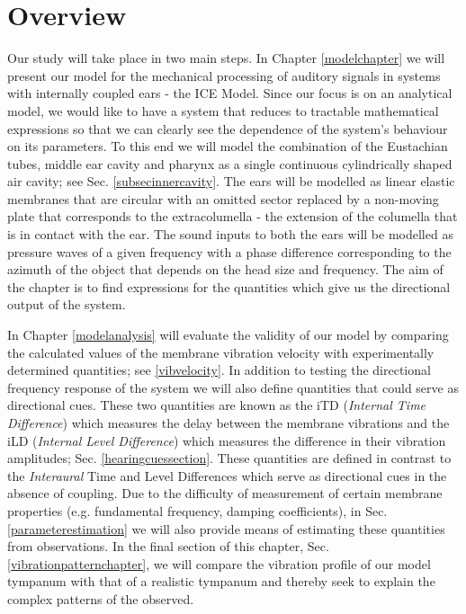 \documentclass[12pt]{book}
\begin{document}
\section{Overview}
Our study will take place in two main steps. In Chapter \ref{modelchapter} we will
present our model for the mechanical processing of auditory signals in systems with internally coupled ears - the ICE Model.
Since our focus is on an analytical model, we would like to have a system that reduces to tractable mathematical expressions
so that we can clearly see the dependence of the system's behaviour on its parameters. To this end we will model the 
combination of the Eustachian tubes, middle ear cavity and pharynx as a single continuous cylindrically shaped air cavity; see
Sec. \ref{subsecinnercavity}. The ears will be modelled as linear elastic membranes that are circular with an omitted sector replaced
by a non-moving plate
that corresponds to the extracolumella - the extension of the columella that is in contact with the ear. The
sound inputs to both the ears will be modelled as pressure waves of a given frequency with a phase difference corresponding to the azimuth of the object that depends on the 
head size and frequency. The aim of the chapter is to find expressions for the quantities which give us the directional output of the system.

In Chapter \ref{modelanalysis} will evaluate the validity of our model
by comparing the calculated values of the membrane vibration velocity with experimentally determined quantities; 
see \ref{vibvelocity}. In addition to testing the directional frequency
response of the system we will also define quantities that could serve as directional cues. These two quantities are known
as the iTD (\emph{Internal Time Difference}) which measures the delay between the membrane vibrations and the iLD (\emph{Internal Level
Difference}) which measures the difference in their vibration amplitudes; Sec. \ref{hearingcuessection}. These quantities are defined in contrast to the
\emph{Interaural} Time and Level  Differences which serve as directional cues in the absence of coupling. Due to the difficulty of measurement of certain membrane
properties (e.g. fundamental frequency, damping coefficients), in Sec. \ref{parameterestimation} we will also provide means of estimating these quantities from observations.
In the final section of this chapter, Sec. \ref{vibrationpatternchapter}, we will compare the vibration profile of our model tympanum with that of a realistic tympanum and thereby
seek to explain the complex patterns of the observed.


\end{document}
